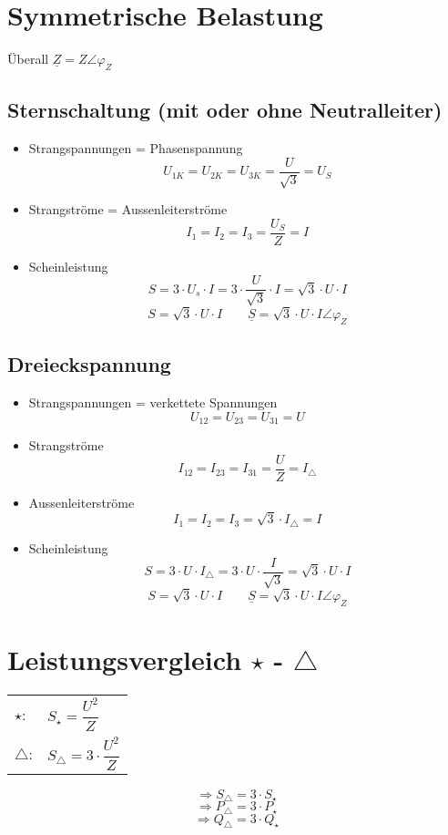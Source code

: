\documentclass[a4,paper,fleqn]{article}
\begin{document}
\section{Symmetrische Belastung}
Überall $\underline{Z} = Z \angle\varphi_Z$

\subsection{Sternschaltung (mit oder ohne Neutralleiter)}
\begin{itemize}
    \item Strangspannungen = Phasenspannung
        \[ U_{1K} = U_{2K} = U_{3K} = \frac{U}{\sqrt{3}} = U_S \]
    \item Strangströme = Aussenleiterströme
        \[ I_1 = I_2 = I_3 = \frac{U_S}{Z} = I \]
    \item Scheinleistung
        \[ S = 3 \cdot U_s \cdot I = 3 \cdot \frac{U}{\sqrt{3}} \cdot I = \sqrt{3} \cdot U \cdot I \]
        \[ \boxed{S = \sqrt{3} \cdot U \cdot I \qquad 
            \underline{S} = \sqrt{3} \cdot U \cdot I \angle \varphi_Z} \]
\end{itemize}

\subsection{Dreieckspannung}
\begin{itemize}
    \item Strangspannungen = verkettete Spannungen
        \[ U_{12} = U_{23} = U_{31} = U \]
    \item Strangströme
        \[ I_{12} = I_{23} = I_{31} = \frac{U}{Z} = I_{\triangle} \]
    \item Aussenleiterströme
        \[ I_1 = I_2 = I_3 = \sqrt{3} \cdot I_{\triangle} = I \]
    \item Scheinleistung
        \[ S = 3 \cdot U \cdot I_{\triangle} = 3 \cdot U \cdot \frac{I}{\sqrt{3}} = \sqrt{3} \cdot U \cdot I \]
        \[ \boxed{S = \sqrt{3} \cdot U \cdot I \qquad 
            \underline{S} = \sqrt{3} \cdot U \cdot I \angle \varphi_Z} \]
\end{itemize}

\section{Leistungsvergleich $\star$ - $\triangle$}
\begin{tabular}{ll}
    $\star$:     & $S_{\star} = \dfrac{U^2}{Z}$ \\ 
    $\triangle$: & $S_{\triangle} = 3 \cdot \dfrac{U^2}{Z}$ \\
\end{tabular}
\[ \Rightarrow S_{\triangle} = 3 \cdot S_{\star} \]
\[ \Rightarrow P_{\triangle} = 3 \cdot P_{\star} \]
\[ \Rightarrow Q_{\triangle} = 3 \cdot Q_{\star} \]
\end{document}
